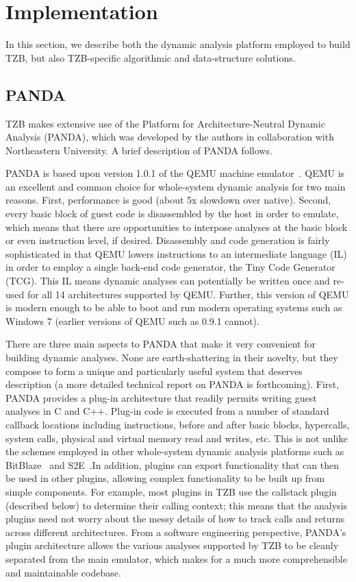 \section{Implementation}
\label{sec:implementation}

In this section, we describe both the dynamic analysis platform employed to
build TZB, but also TZB-specific algorithmic and data-structure solutions.

\subsection{PANDA}
\label{sec:implementation:subsec:panda}

TZB makes extensive use of the Platform for Architecture-Neutral Dynamic
Analysis (PANDA), which was developed by the authors in collaboration
with Northeastern University. A brief description of PANDA follows.

PANDA is based upon version 1.0.1 of the QEMU machine
emulator~\cite{Bellard:2005}. QEMU is an excellent and common choice
for whole-system dynamic analysis for two main reasons. First,
performance is good (about 5x slowdown over native). Second, every basic
block of guest code is disassembled by the host in order to emulate,
which means that there are opportunities to interpose analyses at the
basic block or even instruction level, if desired. Disassembly and code
generation is fairly sophisticated in that QEMU lowers instructions to
an intermediate language (IL) in order to employ a single back-end code
generator, the Tiny Code Generator (TCG). This IL means dynamic
analyses can potentially be written once and re-used for all 14
architectures supported by QEMU. Further, this version of QEMU is modern
enough to be able to boot and run modern operating systems such as
Windows 7 (earlier versions of QEMU such as 0.9.1 cannot).

There are three main aspects to PANDA that make it very convenient for
building dynamic analyses. None are earth-shattering in
their novelty, but they compose to form a unique and particularly useful
system that deserves description (a more detailed technical report on
PANDA is forthcoming). First, PANDA provides a plug-in architecture that
readily permits writing guest analyses in C and C++. Plug-in code is
executed from a number of standard callback locations including
instructions, before and after basic blocks, hypercalls, system calls,
physical and virtual memory read and writes, etc. This is not unlike the
schemes employed in other whole-system dynamic analysis platforms such
as BitBlaze~\cite{Song:2008bitblaze} and S2E~\cite{Chipounov:2011s2e}.In
addition, plugins can export functionality that can then be used in
other plugins, allowing complex functionality to be built up from simple
components. For example, most plugins in TZB use the callstack plugin
(described below) to determine their calling context; this means that
the analysis plugins need not worry about the messy details of how to
track calls and returns across different architectures. From a software
engineering perspective, PANDA's plugin architecture allows the various
analyses supported by TZB to be cleanly separated from the main
emulator, which makes for a much more comprehensible and maintainable
codebase.

